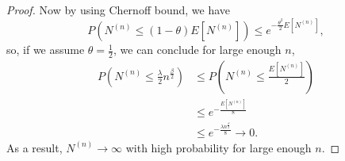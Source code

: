 \begin{proof}
Now by using Chernoff bound, we have
\[P\left(N^{(n)} \leq (1- \theta) E\left[N^{(n)}\right]\right) \leq e^{-\frac{\theta^2}{2}E\left[N^{(n)}\right]},\]
so, if we assume $\theta=\frac{1}{2}$, we can conclude for large enough $n$,
\begin{align}
\nonumber P\left(N^{(n)} \leq \frac{\lambda}{2}n^{\frac{\beta}{2}}\right) &\leq P\left(N^{(n)} \leq \frac{E\left[N^{(n)}\right]}{2}\right)\\
\nonumber &\leq e^{-\frac{E[N^{(n)}]}{8}}\\
\nonumber &\leq e^{-\frac{\lambda n^{\frac{\beta}{2}}}{8}} \rightarrow 0.
\end{align}
As a result, $N^{(n)} \rightarrow \infty$ with high probability for large enough $n.$

\end{proof}